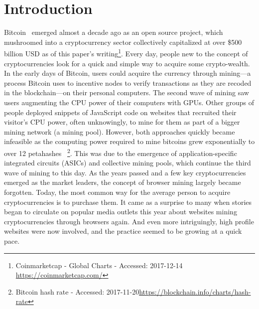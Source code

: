 

\section{Introduction}

Bitcoin~\cite{nakamoto2008bitcoin} emerged almost a decade ago as an open source project, which mushroomed into a cryptocurrency sector collectively capitalized at over \$500 billion USD as of this paper's writing\footnote{Coinmarketcap - Global Charts - Accessed: 2017-12-14 \url{https://coinmarketcap.com/}}. Every day, people new to the concept of cryptocurrencies look for a quick and simple way to acquire some crypto-wealth. In the early days of Bitcoin, users could acquire the currency through mining---a process Bitcoin uses to incentive nodes to verify transactions as they are recoded in the blockchain---on their personal computers. The second wave of mining saw users augmenting the CPU power of their computers with GPUs. Other groups of people deployed snippets of JavaScript code on websites that recruited their visitor's CPU power, often unknowingly, to mine for them as part of a bigger mining network (\ie a mining pool). However, both approaches quickly became infeasible as the computing power required to mine bitcoins grew exponentially to over 12 petahashes ~\footnote{Bitcoin hash rate - Accessed: 2017-11-20\url{https://blockchain.info/charts/hash-rate}}. This was due to the emergence of application-specific integrated circuits (ASICs) and collective mining pools, which continue the third wave of mining to this day. As the years passed and a few key cryptocurrencies emerged as the market leaders, the concept of browser mining largely became forgotten. Today, the most common way for the average person to acquire cryptocurrencies is to purchase them. It came as a surprise to many when stories began to circulate on popular media outlets this year about websites mining cryptocurrencies through browsers again. And even more intriguingly, high profile websites were now involved, and the practice seemed to be growing at a quick pace.



